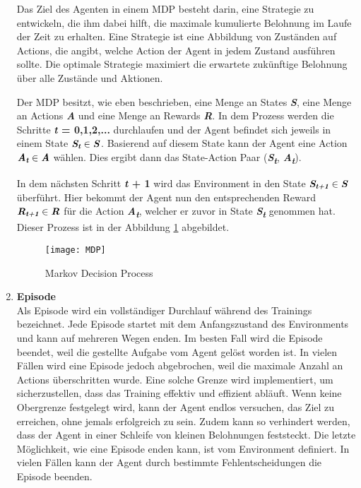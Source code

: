 \begin{enumerate}
    Das Ziel des Agenten in einem MDP besteht darin, eine Strategie zu entwickeln, die ihm dabei hilft, die maximale kumulierte Belohnung im Laufe der Zeit zu erhalten. Eine Strategie ist eine Abbildung von Zuständen auf Actions, die angibt, welche Action der Agent in jedem Zustand ausführen sollte. Die optimale Strategie maximiert die erwartete zukünftige Belohnung über alle Zustände und Aktionen.
    
    Der MDP besitzt, wie eben beschrieben, eine Menge an States \textbf{\textit{S}}, eine Menge an Actions \textbf{\textit{A}} und eine Menge an Rewards \textbf{\textit{R}}.
    In dem Prozess werden die Schritte \textbf{\textit{t} = 0,1,2,...} durchlaufen und der Agent befindet sich jeweils in einem State $ \text{\textbf{\textit{S\textsubscript{t}}}}\in \text{\textbf{\textit{S}}}$. 
    Basierend auf diesem State kann der Agent eine Action $ \text{\textbf{\textit{A\textsubscript{t}}}}\in \text{\textbf{\textit{A}}}$ wählen. Dies ergibt dann das State-Action Paar (\textbf{\textit{S\textsubscript{t}}}, \textbf{\textit{A\textsubscript{t}}}).

    In dem nächsten Schritt \textbf{\textit{t} + 1} wird das Environment in den State $ \text{\textbf{\textit{S\textsubscript{t+1}}}}\in \text{\textbf{\textit{S}}}$ überführt.
    Hier bekommt der Agent nun den entsprechenden Reward $ \text{\textbf{\textit{R\textsubscript{t+1}}}}\in \text{\textbf{\textit{R}}}$ für die Action \textbf{\textit{A\textsubscript{t}}},
    welcher er zuvor in State \textbf{\textit{S\textsubscript{t}}} genommen hat. Dieser Prozess ist in der Abbildung \ref{MDP} abgebildet.


    \begin{figure}
        \texttt{[image: MDP]}
        \caption{Markov Decision Process}
        \label{MDP}
    \end{figure}
    \item \label{itm:Episode} \textbf{Episode} \\
    Als Episode \cite{lesswrongWhatTraining} wird ein vollständiger Durchlauf während des Trainings bezeichnet. Jede Episode startet mit dem Anfangszustand des Environments und kann auf mehreren Wegen enden. Im besten Fall wird die Episode beendet, weil die gestellte Aufgabe vom Agent gelöst worden ist. In vielen Fällen wird eine Episode jedoch abgebrochen, weil die maximale Anzahl an Actions überschritten wurde. Eine solche Grenze wird implementiert, um sicherzustellen, dass das Training effektiv und effizient abläuft. Wenn keine Obergrenze festgelegt wird, kann der Agent endlos versuchen, das Ziel zu erreichen, ohne jemals erfolgreich zu sein. Zudem kann so verhindert werden, dass der Agent in einer Schleife von kleinen Belohnungen feststeckt. Die letzte Möglichkeit, wie eine Episode enden kann, ist vom Environment definiert. In vielen Fällen kann der Agent durch bestimmte Fehlentscheidungen die Episode beenden.
    

\end{enumerate}
